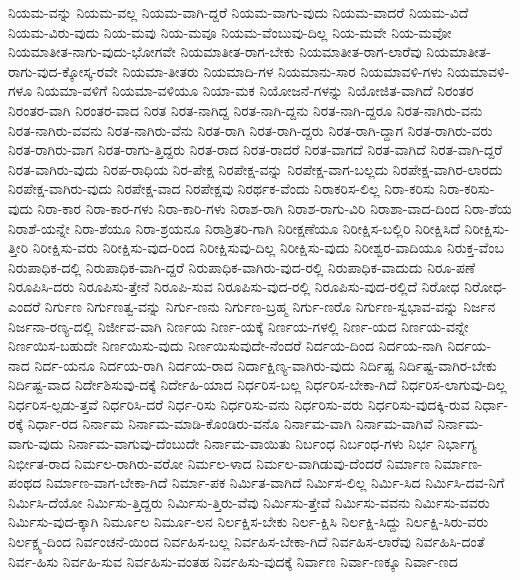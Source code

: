 {ನಿಯಮ-ವನ್ನು
ನಿಯಮ-ವಲ್ಲ
ನಿಯಮ-ವಾಗಿ-ದ್ದರೆ
ನಿಯಮ-ವಾಗು-ವುದು
ನಿಯಮ-ವಾದರೆ
ನಿಯಮ-ವಿದೆ
ನಿಯಮ-ವಿರು-ವುದು
ನಿಯ-ಮವು
ನಿಯ-ಮವೂ
ನಿಯಮ-ವೆಂಬುವು-ದಿಲ್ಲ
ನಿಯ-ಮವೇ
ನಿಯ-ಮವೋ
ನಿಯಮಾತೀತ-ನಾಗು-ವುದು-ಭೋಗವೇ
ನಿಯಮಾತೀತ-ರಾಗ-ಬೇಕು
ನಿಯಮಾತೀತ-ರಾಗ-ಲಾರೆವು
ನಿಯಮಾತೀತ-ರಾಗು-ವುದ-ಕ್ಕೋಸ್ಕ-ರವೇ
ನಿಯಮಾ-ತೀತರು
ನಿಯಮಾದಿ-ಗಳ
ನಿಯಮಾನು-ಸಾರ
ನಿಯಮಾವಳಿ-ಗಳು
ನಿಯಮಾವಳಿ-ಗಳೂ
ನಿಯಮಾ-ವಳಿಗೆ
ನಿಯಮಾ-ವಳಿಯೂ
ನಿಯಾ-ಮಕ
ನಿಯೋಜನೆ-ಗಳನ್ನು
ನಿಯೋಜಿತ-ವಾಗಿದೆ
ನಿರಂತರ
ನಿರಂತರ-ವಾಗಿ
ನಿರಂತರ-ವಾದ
ನಿರತ
ನಿರತ-ನಾಗಿದ್ದ
ನಿರತ-ನಾಗಿ-ದ್ದನು
ನಿರತ-ನಾಗಿ-ದ್ದರೂ
ನಿರತ-ನಾಗಿರು-ವನು
ನಿರತ-ನಾಗಿರು-ವವನು
ನಿರತ-ನಾಗಿರು-ವೆನು
ನಿರತ-ರಾಗಿ
ನಿರತ-ರಾಗಿ-ದ್ದರು
ನಿರತ-ರಾಗಿ-ದ್ದಾಗ
ನಿರತ-ರಾಗಿರು-ವರು
ನಿರತ-ರಾಗಿರು-ವಾಗ
ನಿರತ-ರಾಗು-ತ್ತಿದ್ದರು
ನಿರತ-ರಾದ
ನಿರತ-ರಾದರೆ
ನಿರತ-ವಾಗದೆ
ನಿರತ-ವಾಗಿದೆ
ನಿರತ-ವಾಗಿ-ದ್ದರೆ
ನಿರತ-ವಾಗಿರು-ವುದು
ನಿರಪ-ರಾಧಿಯ
ನಿರ-ಪೇಕ್ಷ
ನಿರಪೇಕ್ಷ-ವನ್ನು
ನಿರಪೇಕ್ಷ-ವಾಗ-ಬಲ್ಲದು
ನಿರಪೇಕ್ಷ-ವಾಗಿರ-ಲಾರದು
ನಿರಪೇಕ್ಷ-ವಾಗಿರು-ವುದು
ನಿರಪೇಕ್ಷ-ವಾದ
ನಿರಪೇಕ್ಷವು
ನಿರರ್ಥಕ-ವೆಂದು
ನಿರಾಕರಿಸ-ಲಿಲ್ಲ
ನಿರಾ-ಕರಿಸು
ನಿರಾ-ಕರಿಸು-ವುದು
ನಿರಾ-ಕಾರ
ನಿರಾ-ಕಾರ-ಗಳು
ನಿರಾ-ಕಾರಿ-ಗಳು
ನಿರಾಶ-ರಾಗಿ
ನಿರಾಶ-ರಾಗು-ವಿರಿ
ನಿರಾಶಾ-ವಾದ-ದಿಂದ
ನಿರಾ-ಶೆಯ
ನಿರಾಶೆ-ಯನ್ನೇ
ನಿರಾ-ಶೆಯೂ
ನಿರಾ-ಶ್ರಯನೂ
ನಿರಾಶ್ರಿತರಿ-ಗಾಗಿ
ನಿರೀಕ್ಷಣೆಯೂ
ನಿರೀಕ್ಷಿಸ-ಬಲ್ಲಿರಿ
ನಿರೀಕ್ಷಿಸಿದೆ
ನಿರೀಕ್ಷಿಸು-ತ್ತೀರಿ
ನಿರೀಕ್ಷಿಸು-ವರು
ನಿರೀಕ್ಷಿಸು-ವುದ-ರಿಂದ
ನಿರೀಕ್ಷಿಸುವು-ದಿಲ್ಲ
ನಿರೀಕ್ಷಿಸು-ವುದು
ನಿರೀಶ್ವರ-ವಾದಿಯೂ
ನಿರುಕ್ತ-ವೆಂಬ
ನಿರುಪಾಧಿಕ-ದಲ್ಲಿ
ನಿರುಪಾಧಿಕ-ವಾಗಿ-ದ್ದರೆ
ನಿರುಪಾಧಿಕ-ವಾಗಿರು-ವುದ-ರಲ್ಲಿ
ನಿರುಪಾಧಿಕ-ವಾದುದು
ನಿರೂ-ಪಣೆ
ನಿರೂಪಿಸಿ-ದರು
ನಿರೂಪಿಸು-ತ್ತೇನೆ
ನಿರೂಪಿ-ಸುವ
ನಿರೂಪಿಸು-ವುದ-ರಲ್ಲಿ
ನಿರೂಪಿಸು-ವುದ-ರಲ್ಲಿದೆ
ನಿರೋಧ
ನಿರೋಧ-ಎಂದರೆ
ನಿರ್ಗುಣ
ನಿರ್ಗುಣತ್ವ-ವನ್ನು
ನಿರ್ಗು-ಣನು
ನಿರ್ಗುಣ-ಬ್ರಹ್ಮ
ನಿರ್ಗು-ಣರೊ
ನಿರ್ಗುಣ-ಸ್ವಭಾವ-ವನ್ನು
ನಿರ್ಜನ
ನಿರ್ಜನಾ-ರಣ್ಯ-ದಲ್ಲಿ
ನಿರ್ಜೀವ-ವಾಗಿ
ನಿರ್ಣಯ
ನಿರ್ಣ-ಯಕ್ಕೆ
ನಿರ್ಣಯ-ಗಳಲ್ಲಿ
ನಿರ್ಣ-ಯದ
ನಿರ್ಣಯ-ವನ್ನೇ
ನಿರ್ಣಯಿಸ-ಬಹುದೇ
ನಿರ್ಣಯಿಸು-ವುದು
ನಿರ್ಣಯಿಸುವುದೇ-ನೆಂದರೆ
ನಿರ್ದಯ-ದಿಂದ
ನಿರ್ದಯ-ನಾಗಿ
ನಿರ್ದಯ-ನಾದ
ನಿರ್ದ-ಯನೂ
ನಿರ್ದಯ-ರಾಗಿ
ನಿರ್ದಯ-ರಾದ
ನಿರ್ದಾಕ್ಷಿಣ್ಯ-ವಾಗಿರು-ವುದು
ನಿರ್ದಿಷ್ಟ
ನಿರ್ದಿಷ್ಟ-ವಾಗಿರ-ಬೇಕು
ನಿರ್ದಿಷ್ಟ-ವಾದ
ನಿರ್ದೇಶಿಸುವು-ದಕ್ಕೆ
ನಿರ್ದೇಹಿ-ಯಾದ
ನಿರ್ಧರಿಸ-ಬಲ್ಲ
ನಿರ್ಧರಿಸ-ಬೇಕಾ-ಗಿದೆ
ನಿರ್ಧರಿಸ-ಲಾಗುವು-ದಿಲ್ಲ
ನಿರ್ಧರಿಸ-ಲ್ಪಡು-ತ್ತವೆ
ನಿರ್ಧರಿಸಿ-ದರೆ
ನಿರ್ಧ-ರಿಸು
ನಿರ್ಧರಿಸು-ವನು
ನಿರ್ಧರಿಸು-ವರು
ನಿರ್ಧರಿಸು-ವುದಕ್ಕಿ-ರುವ
ನಿರ್ಧಾ-ರಕ್ಕೆ
ನಿರ್ಧಾ-ರದ
ನಿರ್ನಾಮ
ನಿರ್ನಾಮ-ಮಾಡಿ-ಕೊಂಡಿರು-ವನೊ
ನಿರ್ನಾಮ-ವಾಗಿ
ನಿರ್ನಾಮ-ವಾಗಿವೆ
ನಿರ್ನಾಮ-ವಾಗು-ವುದು
ನಿರ್ನಾಮ-ವಾಗುವು-ದೆಂಬುದೇ
ನಿರ್ನಾಮ-ವಾಯಿತು
ನಿರ್ಬಂಧ
ನಿರ್ಬಂಧ-ಗಳು
ನಿರ್ಭ
ನಿರ್ಭಾಗ್ಯ
ನಿರ್ಭೀತ-ರಾದ
ನಿರ್ಮಲ-ರಾಗಿರು-ವರೋ
ನಿರ್ಮಲ-ಳಾದ
ನಿರ್ಮಲ-ವಾಗಿಡುವು-ದೆಂದರೆ
ನಿರ್ಮಾಣ
ನಿರ್ಮಾಣ-ಪಂಥದ
ನಿರ್ಮಾಣ-ವಾಗ-ಬೇಕಾ-ಗಿದೆ
ನಿರ್ಮಾ-ಪಕ
ನಿರ್ಮಿತ-ವಾಗಿದೆ
ನಿರ್ಮಿಸ-ಲಿಲ್ಲ
ನಿರ್ಮಿ-ಸಿದ
ನಿರ್ಮಿಸಿ-ದವ-ನಿಗೆ
ನಿರ್ಮಿಸಿ-ದೆಯೋ
ನಿರ್ಮಿಸು-ತ್ತಿದ್ದರು
ನಿರ್ಮಿಸು-ತ್ತಿರು-ವೆವು
ನಿರ್ಮಿಸು-ತ್ತೇವೆ
ನಿರ್ಮಿಸು-ವವನು
ನಿರ್ಮಿಸು-ವವರು
ನಿರ್ಮಿಸು-ವುದ-ಕ್ಕಾಗಿ
ನಿರ್ಮೂಲ
ನಿರ್ಮೂ-ಲನ
ನಿರ್ಲಕ್ಷಿಸ-ಬೇಕು
ನಿರ್ಲ-ಕ್ಷಿಸಿ
ನಿರ್ಲಕ್ಷಿ-ಸಿದ್ದು
ನಿರ್ಲಕ್ಷಿ-ಸಿರು-ವರು
ನಿರ್ಲಕ್ಷ್ಯ-ದಿಂದ
ನಿರ್ವಂಚನೆ-ಯಿಂದ
ನಿರ್ವಹಿಸ-ಬಲ್ಲ
ನಿರ್ವಹಿಸ-ಬೇಕಾ-ಗಿದೆ
ನಿರ್ವಹಿಸ-ಲಾರೆವು
ನಿರ್ವಹಿಸಿ-ದಂತೆ
ನಿರ್ವ-ಹಿಸು
ನಿರ್ವಹಿ-ಸುವ
ನಿರ್ವಹಿಸು-ವಂತಹ
ನಿರ್ವಹಿಸು-ವುದಕ್ಕೆ
ನಿರ್ವಾಣ
ನಿರ್ವಾ-ಣಕ್ಕೂ
ನಿರ್ವಾ-ಣದ
}
